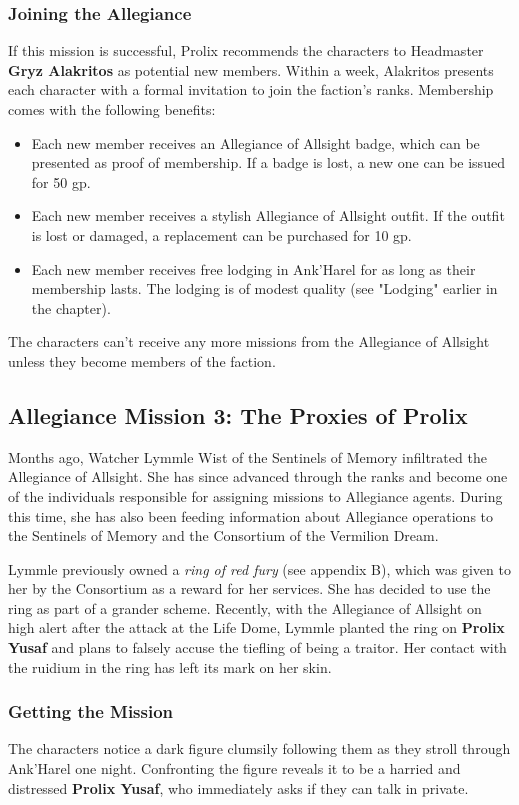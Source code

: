 \documentclass[10pt,a4paper,twoside,bg=print,twocolumn,openany,nodeprecatedcode]{dndbook}
\begin{document}
\subsubsection{Joining the Allegiance}
If this mission is successful, Prolix recommends the characters to Headmaster \textbf{Gryz Alakritos} as potential new members. Within a week, Alakritos presents each character with a formal invitation to join the faction's ranks. Membership comes with the following benefits:


\begin{itemize}
\item Each new member receives an Allegiance of Allsight badge, which can be presented as proof of membership. If a badge is lost, a new one can be issued for 50 gp.
\item Each new member receives a stylish Allegiance of Allsight outfit. If the outfit is lost or damaged, a replacement can be purchased for 10 gp.
\item Each new member receives free lodging in Ank'Harel for as long as their membership lasts. The lodging is of modest quality (see "Lodging" earlier in the chapter).
\end{itemize}

The characters can't receive any more missions from the Allegiance of Allsight unless they become members of the faction.

\subsection{Allegiance Mission 3: The Proxies of Prolix}
Months ago, Watcher Lymmle Wist of the Sentinels of Memory infiltrated the Allegiance of Allsight. She has since advanced through the ranks and become one of the individuals responsible for assigning missions to Allegiance agents. During this time, she has also been feeding information about Allegiance operations to the Sentinels of Memory and the Consortium of the Vermilion Dream.

Lymmle previously owned a \textit{ring of red fury} (see appendix B), which was given to her by the Consortium as a reward for her services. She has decided to use the ring as part of a grander scheme. Recently, with the Allegiance of Allsight on high alert after the attack at the Life Dome, Lymmle planted the ring on \textbf{Prolix Yusaf} and plans to falsely accuse the tiefling of being a traitor. Her contact with the ruidium in the ring has left its mark on her skin.

\subsubsection{Getting the Mission}
The characters notice a dark figure clumsily following them as they stroll through Ank'Harel one night. Confronting the figure reveals it to be a harried and distressed \textbf{Prolix Yusaf}, who immediately asks if they can talk in private.
\end{document}
